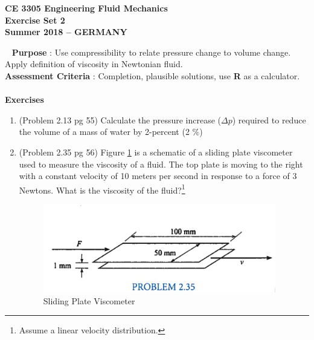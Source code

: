 \documentclass[12pt]{article}
\begin{document}
\begingroup
\begin{center}
{\textbf{{ CE 3305 Engineering Fluid Mechanics} \\ Exercise Set 2 \\ Summer 2018 -- GERMANY} }
\end{center}
\endgroup
\begingroup
~\newline
\textbf{Purpose} : Use compressibility to relate pressure change to volume change.  Apply definition of viscosity in Newtonian fluid. \\
\textbf{Assessment Criteria} : Completion, plausible solutions, use \textbf{R} as a calculator. \\~\\
\textbf{Exercises}

\begin{enumerate}
\item (Problem 2.13 pg 55)
Calculate the pressure increase ($\Delta p$) required to reduce the volume of a mass of water by 2-percent (2 $\%$) 

\item (Problem 2.35 pg 56)
Figure \ref{fig:SlidingPlateViscosity} is a schematic of a sliding plate viscometer used to measure the viscosity of a fluid. 
The top plate is moving to the right with a constant velocity of 10 meters per second in response to a force of 3 Newtons.
What is the viscosity of the fluid?\footnote{Assume a linear velocity distribution.}
\begin{figure}[htbp] %
   \centering
   \includegraphics[width=4in]{SlidingPlateViscosity.jpg} 
   \caption{Sliding Plate Viscometer}
   \label{fig:SlidingPlateViscosity}
\end{figure}

\end{enumerate}
\end{document}
